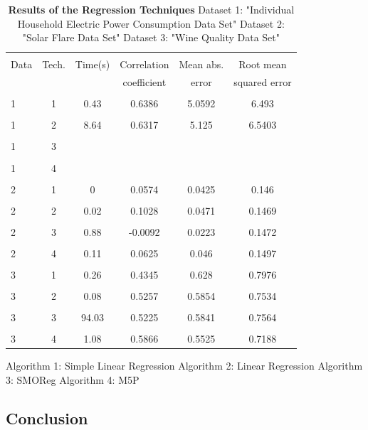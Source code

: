 \documentclass[a4paper]{article}
\begin{document}
\begin{table}
\begin{tabular}{|l| c | c |c |c |c |}
\hline & & & & & \\
Data & Tech. & Time(s) & Correlation & Mean abs.  & Root mean \\
 & & & coefficient & error & squared error  \\
\hline & & & & &  \\
1  & 1  & 0.43  & 0.6386  & 5.0592  & 6.493  \\ 
\hline & & & & & \\
1  & 2  & 8.64  & 0.6317  & 5.125  &  6.5403 \\ 
\hline & & & & & \\
1  & 3  &   &   &  &  \\ 
\hline & & & & & \\
1  & 4  &   &   &  &  \\ 
\hline & & & & & \\
2  & 1  & 0  & 0.0574  & 0.0425 & 0.146 \\ 
\hline & & & & & \\
2  & 2  & 0.02  &  0.1028 & 0.0471 & 0.1469  \\ 
\hline & & & & & \\
2  & 3  & 0.88  & -0.0092 & 0.0223 & 0.1472 \\ 
\hline & & & & & \\
2  & 4  & 0.11  & 0.0625  & 0.046   & 0.1497 \\ 
\hline & & & & & \\
3  & 1  & 0.26   & 0.4345  & 0.628   &  0.7976\\ 
\hline & & & & & \\
3  & 2  & 0.08  & 0.5257  & 0.5854 & 0.7534  \\ 
\hline & & & & & \\
3  & 3  & 94.03  &  0.5225  & 0.5841 & 0.7564 \\ 
\hline & & & & & \\
3  & 4  & 1.08  & 0.5866  & 0.5525  & 0.7188 \\ 
\hline
\end{tabular}
\caption{\textbf{Results of the Regression Techniques}
    Dataset 1: "Individual Household Electric Power Consumption Data Set" 
    Dataset 2: "Solar Flare Data Set"
    Dataset 3: "Wine Quality Data Set"}
    Algorithm 1: Simple Linear Regression
    Algorithm 2: Linear Regression
    Algorithm 3: SMOReg
    Algorithm 4: M5P
\end{table}


\subsection{Conclusion}
\end{document}
